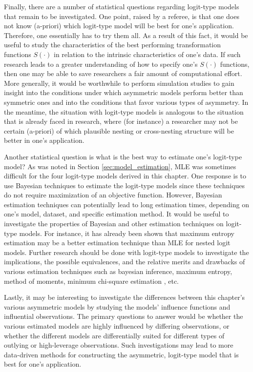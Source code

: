 Finally, there are a number of statistical questions regarding logit-type models that remain to be investigated. One point, raised by a referee, is that one does not know (a-priori) which logit-type model will be best for one's application. Therefore, one essentially has to try them all. As a result of this fact, it would be useful to study the characteristics of the best performing transformation functions $S \left( \cdot \right)$ in relation to the intrinsic characteristics of one's data. If such research leads to a greater understanding of how to specify one's $S \left( \cdot \right)$ functions, then one may be able to save researchers a fair amount of computational effort. More generally, it would be worthwhile to perform simulation studies to gain insight into the conditions under which asymmetric models perform better than symmetric ones and into the conditions that favor various types of asymmetry. In the meantime, the situation with logit-type models is analogous to the situation that is already faced in research, where (for instance) a researcher may not be certain (a-priori) of which plausible nesting or cross-nesting structure will be better in one's application.

Another statistical question is what is the best way to estimate one's logit-type model? As was noted in Section \ref{sec:model_estimation}, MLE was sometimes difficult for the four logit-type models derived in this chapter. One response is to use Bayesian techniques to estimate the logit-type models since these techniques do not require maximization of an objective function. However, Bayesian estimation techniques can potentially lead to long estimation times, depending on one's model, dataset, and specific estimation method. It would be useful to investigate the properties of Bayesian and other estimation techniques on logit-type models. For instance, it has already been shown that maximum entropy estimation \citep{donoso_maximum_2011} may be a better estimation technique than MLE for nested logit models. Further research should be done with logit-type models to investigate the implications, the possible equivalences, and the relative merits and drawbacks of various estimation techniques such as bayesian inference, maximum entropy, method of moments, minimum chi-square estimation \citep{berkson_minimum_1980}, etc.

Lastly, it may be interesting to investigate the differences between this chapter's various asymmetric models by studying the models' influence functions and influential observations. The primary questions to answer would be whether the various estimated models are highly influenced by differing observations, or whether the different models are differentially suited for different types of outlying or high-leverage observations. Such investigations may lead to more data-driven methods for constructing the asymmetric, logit-type model that is best for one's application. 

